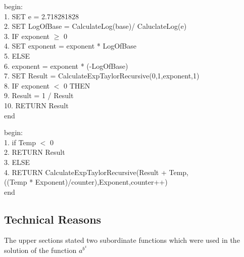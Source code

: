 \documentclass[a4paper, 11pt]{article}
\begin{document}
\begin{algorithm}
begin:\\
1. SET e = 2.718281828\\
2. SET LogOfBase = CalculateLog(base)/ CaluclateLog(e) \\
3. IF exponent $\geq$ 0\\
4. \hspace{3em} SET exponent = exponent * LogOfBase \\
5. ELSE \\
6. \hspace{3em} exponent = exponent * (-LogOfBase)\\
7. SET Result = CalculateExpTaylorRecursive(0,1,exponent,1) \\
8. IF exponent $<$ 0 THEN\\
9. \hspace{3em} Result = 1 / Result\\
10. RETURN Result\\
end
\caption{CalculatePower(base,exponent)}
\end{algorithm}

\begin{algorithm}
begin:\\
1. if Temp $<$ 0\\
2. \hspace{3em} RETURN Result \\
3. ELSE \\
4. \hspace{3em} RETURN CalculateExpTaylorRecursive(Result + Temp, \\ \hspace{7em}((Temp * Exponent)/counter),Exponent,counter++)\\
end
\caption{CalculateExpTaylorRecursive(Result,Temp,Exponent,counter)}
\end{algorithm}

\newpage
\subsection{Technical Reasons}

The upper sections stated two subordinate functions which were used in the solution of the function $a^{b^x}$
\end{document}
